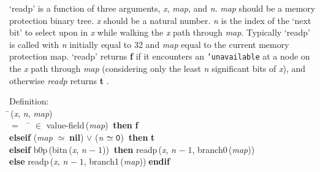  `readp' is a function of three arguments, {\it{x\/}}, {\it{map\/}}, and {\it{n\/}}.  {\it{map\/}} should
 be a memory protection binary tree.  {\it{x\/}} should be a natural number.  {\it{n\/}} is
 the index of the `next bit' to select upon in {\it{x\/}} while walking the {\it{x\/}} path
 through {\it{map\/}}.  Typically `readp' is called with {\it{n\/}} initially equal to 32
 and {\it{map\/}} equal to the current memory protection map.  `readp' returns
 {\bf{f}} if it encounters an {\tt{'}}{\tt{unavailable}} at a node on the {\it{x\/}} path through
 {\it{map\/}} (considering only the least {\it{n\/}} significant bits of {\it{x\/}}), and otherwise
 {\it{readp\/}} returns {\bf{t}} .
\begin{tabbing}{\sc Definition}: \\  
\=\,({\it{x\/}}, {\it{n\/}}, {\it{map\/}}) \\ 
$=$$\;\;\;\;$\= $\in$ {\rm{value-field}}\,({\it{map\/}})$\;\;${\bf then }{\bf{f}} \\ 
{\bf elseif }({\it{map\/}} $\simeq\;${{\bf{nil}}}${}$) $\vee$ ({\it{n\/}} $\simeq {\tt{0}}$)$\;\;${\bf then }{\bf{t}} \\ 
{\bf elseif }{\rm{b0p}}\,({\rm{bitn}}\,({\it{x\/}}, {\it{n\/}} $-\;1$))$\;\;${\bf then }{\rm{readp}}\,({\it{x\/}}, {\it{n\/}} $-\;1$, {\rm{branch0}}\,({\it{map\/}})) \\ 
{\bf else }{\rm{readp}}\,({\it{x\/}}, {\it{n\/}} $-\;1$, {\rm{branch1}}\,({\it{map\/}}))$\;${\bf  endif}\-\-
\end{tabbing}

